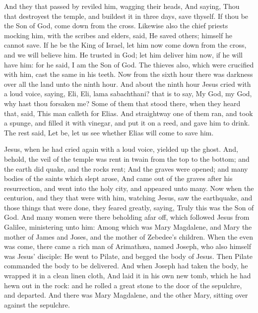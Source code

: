  And they that passed by reviled him, wagging their heads,
 And saying, Thou that destroyest the temple, and buildest
it in three days, save thyself. If thou be the Son of God, come down
from the cross.  Likewise also the chief priests mocking
him, with the scribes and elders, said,  He saved others;
himself he cannot save. If he be the King of Israel, let him now come
down from the cross, and we will believe him.  He trusted
in God; let him deliver him now, if he will have him: for he said, I am
the Son of God.  The thieves also, which were crucified
with him, cast the same in his teeth.  Now from the sixth
hour there was darkness over all the land unto the ninth hour.
 And about the ninth hour Jesus cried with a loud voice,
saying, Eli, Eli, lama sabachthani? that is to say, My God, my God, why
hast thou forsaken me?  Some of them that stood there, when
they heard that, said, This man calleth for Elias.  And
straightway one of them ran, and took a spunge, and filled it with
vinegar, and put it on a reed, and gave him to drink.  The
rest said, Let be, let us see whether Elias will come to save him.

 Jesus, when he had cried again with a loud voice, yielded
up the ghost.  And, behold, the veil of the temple was rent
in twain from the top to the bottom; and the earth did quake, and the
rocks rent;  And the graves were opened; and many bodies of
the saints which slept arose,  And came out of the graves
after his resurrection, and went into the holy city, and appeared unto
many.  Now when the centurion, and they that were with him,
watching Jesus, saw the earthquake, and those things that were done,
they feared greatly, saying, Truly this was the Son of God.
 And many women were there beholding afar off, which
followed Jesus from Galilee, ministering unto him:  Among
which was Mary Magdalene, and Mary the mother of James and Joses, and
the mother of Zebedee's children.  When the even was come,
there came a rich man of Arimathæa, named Joseph, who also himself was
Jesus' disciple:  He went to Pilate, and begged the body of
Jesus. Then Pilate commanded the body to be delivered.  And
when Joseph had taken the body, he wrapped it in a clean linen cloth,
 And laid it in his own new tomb, which he had hewn out in
the rock: and he rolled a great stone to the door of the sepulchre, and
departed.  And there was Mary Magdalene, and the other
Mary, sitting over against the sepulchre.

